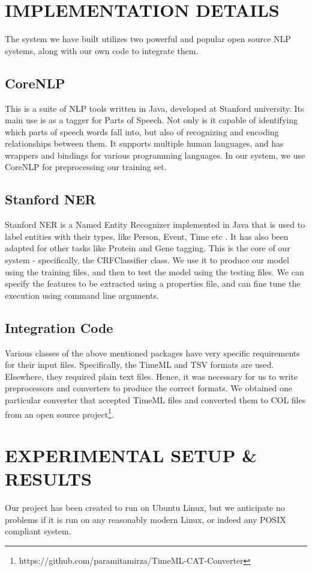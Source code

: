\documentclass[letterpaper, 10 pt, conference]{ieeeconf}
\begin{document}
\section{IMPLEMENTATION DETAILS}

The system we have built utilizes two powerful and popular open source NLP systems, along with our own code to integrate them.

\subsection{CoreNLP}
This is a suite of NLP tools written in Java, developed at Stanford university\cite{c3}. Its main use is as a tagger for Parts of Speech. Not only is it capable of identifying which parts of speech words fall into, but also of recognizing and encoding relationships between them. It supports multiple human languages, and has wrappers and bindings for various programming languages. In our system, we use CoreNLP for preprocessing our training set.


\subsection{Stanford NER}
Stanford NER is a Named Entity Recognizer implemented in Java that is used to label entities with their types, like Person, Event, Time etc \cite{c4}. It has also been adapted for other tasks like Protein and Gene tagging. This is the core of our system - specifically, the CRFClassifier class. We use it to produce our model using the training files, and then to test the model using the testing files. We can specify the features to be extracted using a properties file, and can fine tune the execution using command line arguments.

\subsection{Integration Code}
Various classes of the above mentioned packages have very specific requirements for their input files. Specifically, the TimeML and TSV formats are used. Elsewhere, they required plain text files. Hence, it was necessary for us to write preprocessors and converters to produce the correct formats. We obtained one particular converter that accepted TimeML files and converted them to COL files from an open source project\footnote[2]{https://github.com/paramitamirza/TimeML-CAT-Converter}.

\section{EXPERIMENTAL SETUP \& RESULTS}
Our project has been created to run on Ubuntu Linux, but we anticipate no problems if it is run on any reasonably modern Linux, or indeed any POSIX compliant system.
\end{document}
